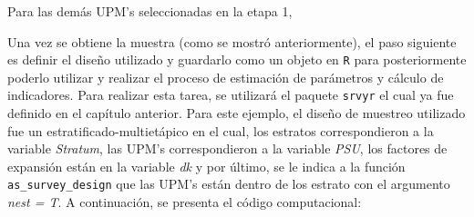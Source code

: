 \documentclass[
  12pt,
]{book}
\newenvironment{Shaded}{\begin{snugshade}}{\end{snugshade}}
\newcommand{\AttributeTok}[1]{\textcolor[rgb]{0.13,0.29,0.53}{#1}}
\newcommand{\ControlFlowTok}[1]{\textcolor[rgb]{0.13,0.29,0.53}{\textbf{#1}}}
\newcommand{\DecValTok}[1]{\textcolor[rgb]{0.00,0.00,0.81}{#1}}
\newcommand{\FunctionTok}[1]{\textcolor[rgb]{0.13,0.29,0.53}{\textbf{#1}}}
\newcommand{\NormalTok}[1]{#1}
\newcommand{\OtherTok}[1]{\textcolor[rgb]{0.56,0.35,0.01}{#1}}
\newcommand{\SpecialCharTok}[1]{\textcolor[rgb]{0.81,0.36,0.00}{\textbf{#1}}}
\newcommand{\StringTok}[1]{\textcolor[rgb]{0.31,0.60,0.02}{#1}}
\begin{document}
Para las demás UPM's seleccionadas en la etapa 1,

\begin{Shaded}
\end{Shaded}

Una vez se obtiene la muestra (como se mostró anteriormente), el paso siguiente es definir el diseño utilizado y guardarlo como un objeto en \texttt{R} para posteriormente poderlo utilizar y realizar el proceso de estimación de parámetros y cálculo de indicadores. Para realizar esta tarea, se utilizará el paquete \texttt{srvyr} el cual ya fue definido en el capítulo anterior. Para este ejemplo, el diseño de muestreo utilizado fue un estratificado-multietápico en el cual, los estratos correspondieron a la variable \emph{Stratum}, las UPM's correspondieron a la variable \emph{PSU}, los factores de expansión están en la variable \emph{dk} y por último, se le indica a la función \texttt{as\_survey\_design} que las UPM's están dentro de los estrato con el argumento \emph{nest = T}. A continuación, se presenta el código computacional:
\end{document}
